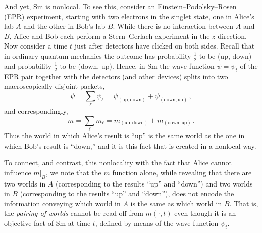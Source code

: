 \documentclass[12pt]{article}
\newcommand{\n}[1]{{#1}}
\begin{document}
And yet, Sm is nonlocal. To see this, consider an Einstein--Podolsky--Rosen (EPR) experiment, starting with two electrons in the singlet state, one in Alice's lab $A$ and the other in Bob's lab $B$. While there is no interaction between $A$ and $B$, Alice and Bob each perform a Stern--Gerlach experiment in the $z$ direction. \n{Now} consider a time $t$ just after detectors have clicked on both sides. Recall that in ordinary quantum mechanics the outcome has probability $\tfrac{1}{2}$ to be (up, down) and probability $\tfrac{1}{2}$ to be (down, up). Hence, in Sm the wave function $\psi=\psi_t$ of the EPR pair together with the detectors (and other \n{devices}) splits \n{into} two macroscopically disjoint packets,
\begin{equation}\label{zzpsi}
\psi=\sum_\ell \psi_\ell = \psi_\mathrm{(up, down)}+\psi_\mathrm{(down, up)}\,,
\end{equation}
and correspondingly,
\begin{equation}\label{zzm}
m= \sum_\ell m_\ell = m_\mathrm{(up, down)} + m_\mathrm{(down, up)}\,.
\end{equation}
Thus the world in which Alice's result is ``up'' is the same world as the one in which Bob's result is ``down,'' and it is this fact that is created in a nonlocal way.

To connect, and contrast, this nonlocality with the fact that Alice cannot influence $m|_B$, we note that the $m$ function alone, while revealing that there are two worlds in $A$ (corresponding to the results ``up'' and ``down'') and two worlds in $B$ (corresponding to the results ``up'' and ``down''), does not encode the information conveying which world in $A$ is the same as which world in $B$. That is, the \emph{pairing of worlds} cannot be read off from $m(\cdot, t)$ even though it is an objective fact of Sm at time $t$, defined by means of the wave function $\psi_t$. 
\end{document}
